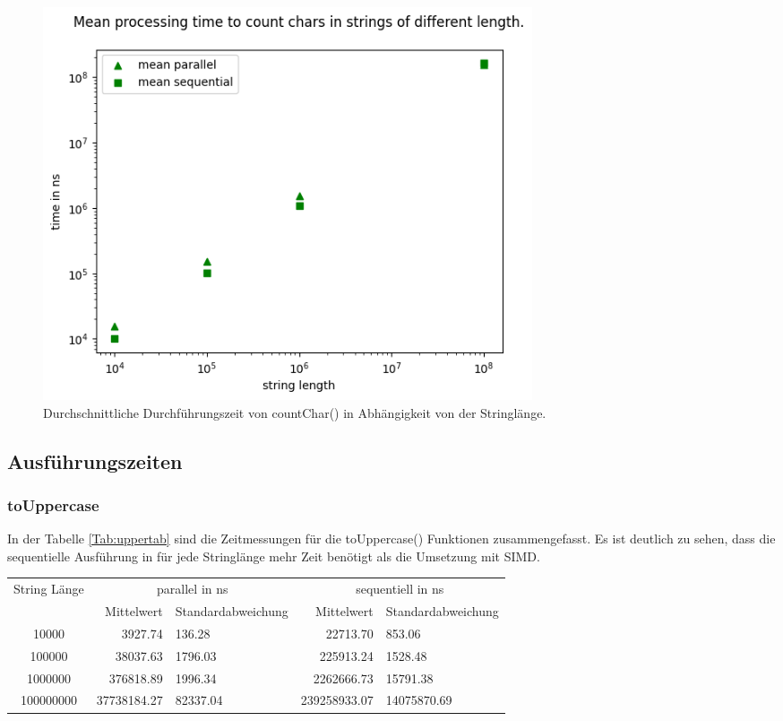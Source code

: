\documentclass[plainarticle,zihtitle,german,final,hyperref,utf8]{zihpub}
\begin{document}
\begin{figure}[h]
	\begin{center}
		\includegraphics[width=0.7\textwidth]{images/complex_count.png}
		\caption{Durchschnittliche Durchführungszeit von countChar() in Abhängigkeit von der Stringlänge.}
		\label{fig:mean_upper}
	\end{center}
\end{figure}


\subsection{Ausführungszeiten}
\subsubsection{toUppercase}
In der Tabelle \ref{Tab:uppertab} sind die Zeitmessungen für die toUppercase() Funktionen zusammengefasst.
Es ist deutlich zu sehen, dass die se­quen­ti­elle Ausführung in für jede Stringlänge mehr Zeit benötigt als die Umsetzung mit SIMD.
\newline
\begin{tabular}{|c|r|l|r|l|}
	\hline
	\multicolumn{1}{|c|}{String Länge} & \multicolumn{2}{c|}{parallel in ns} & \multicolumn{2}{c|}{se­quen­tiell­ in ns} \\
	\cline{2-5}
	& Mittelwert & Standardabweichung  & Mittelwert & Standardabweichung \\
	\hline
	10000 & 3927.74 & 136.28 & 22713.70 & 853.06 \\
	100000 & 38037.63 & 1796.03 & 225913.24 & 1528.48 \\
	1000000 & 376818.89 & 1996.34 & 2262666.73 & 15791.38 \\
	100000000 & 37738184.27 & 82337.04 & 239258933.07 & 14075870.69 \\
	\hline
\end{tabular}
\label{Tab:uppertab}
\end{document}
